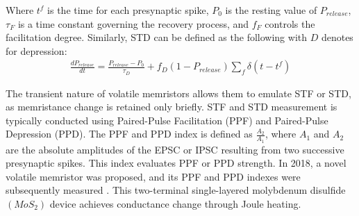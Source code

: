 \noindent Where $t^f$ is the time for each presynaptic spike, $P_0$ is the resting value of $P_{release}$, $\tau_F$ is a time constant governing the recovery process, and $f_F$ controls the facilitation degree. Similarly, STD can be defined as the following with $D$ denotes for depression:
\begin{align}
\frac{dP_{release}}{dt} = \frac{P_{release} - P_0}{\tau_D} + f_D(1 - P_{release})\sum_{f}\delta\left( t- t^f \right) \label{eq:6.14}
\end{align}



The transient nature of volatile memristors allows them to emulate STF or STD, as memristance change is retained only briefly. STF and STD measurement is typically conducted using Paired-Pulse Facilitation (PPF) and Paired-Pulse Depression (PPD). The PPF and PPD index is defined as  $\frac{A_2}{A_1}$, where $A_1$  and $A_2$ are the absolute amplitudes of the EPSC or IPSC resulting from two successive presynaptic spikes. This index evaluates PPF or PPD strength. In 2018, a novel volatile memristor was proposed, and its PPF and PPD indexes were subsequently measured \cite{sun2018synaptic}. This two-terminal single-layered molybdenum disulfide $(MoS_2)$ device achieves conductance change through Joule heating.\\

